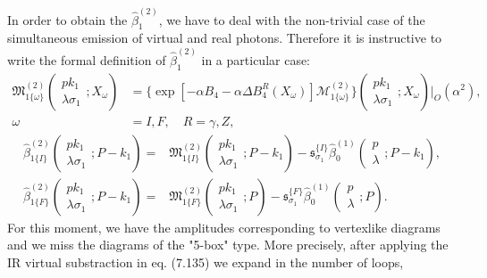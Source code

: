 In order to obtain the $\hat{\beta}^{(2)}_1$, we have to deal with the non-trivial case of the simultaneous emission of virtual and real photons. Therefore it is instructive to write the formal definition of $\hat{\beta}^{(2)}_1$ in a particular case:
\begin{align}
\mathfrak{M}^{(2)}_{1\{\omega\}}\left(\begin{array}{c}
pk_1\\\lambda\sigma_1
\end{array};X_\omega\right)&=\biggl\{ \exp[-\alpha B_4-\alpha \Delta B^R_4(X_\omega)]\mathcal{M}^{(2)}_{1\{\omega\}} \biggr\}\left(\begin{array}{c}
pk_1\\\lambda\sigma_1
\end{array};X_\omega\right)\biggr|_O(\alpha^2),\nonumber\\
\omega&=I,F,\quad R=\gamma,Z,
\end{align}
\begin{align}
\hat{\beta}^{(2)}_{1\{I\}}\left(\begin{array}{c}
pk_1\\\lambda\sigma_1
\end{array};P-k_1\right)=&\mathfrak{M}^{(2)}_{1\{I\}}\left(\begin{array}{c}
pk_1\\\lambda\sigma_1
\end{array};P-k_1\right)-\mathfrak{s}^{\{I\}}_{\sigma_1}\hat{\beta}_0^{(1)}\left(\begin{array}{c}
p\\\lambda
\end{array};P-k_1\right),\nonumber\\
\hat{\beta}^{(2)}_{1\{F\}}\left(\begin{array}{c}
pk_1\\\lambda\sigma_1
\end{array};P-k_1\right)=&\mathfrak{M}^{(2)}_{1\{F\}}\left(\begin{array}{c}
pk_1\\\lambda\sigma_1
\end{array};P\right)-\mathfrak{s}^{\{F\}}_{\sigma_1}\hat{\beta}_0^{(1)}\left(\begin{array}{c}
p\\\lambda
\end{array};P\right).
\end{align}
For this moment, we have the amplitudes corresponding to vertexlike diagrams and we miss the diagrams of the "5-box" type. More precisely, after applying the IR virtual substraction in eq. (7.135) we expand in the number of loops,
